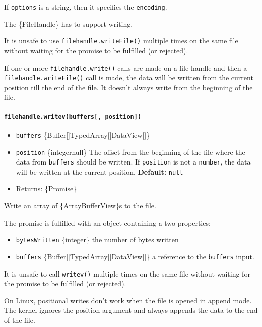 If \texttt{options} is a string, then it specifies the
\texttt{encoding}.

The \{FileHandle\} has to support writing.

It is unsafe to use \texttt{filehandle.writeFile()} multiple times on
the same file without waiting for the promise to be fulfilled (or
rejected).

If one or more \texttt{filehandle.write()} calls are made on a file
handle and then a \texttt{filehandle.writeFile()} call is made, the data
will be written from the current position till the end of the file. It
doesn't always write from the beginning of the file.

\paragraph{\texorpdfstring{\texttt{filehandle.writev(buffers{[},\ position{]})}}{filehandle.writev(buffers{[}, position{]})}}\label{filehandle.writevbuffers-position}

\begin{itemize}
\tightlist
\item
  \texttt{buffers}
  \{Buffer{[}{]}\textbar TypedArray{[}{]}\textbar DataView{[}{]}\}
\item
  \texttt{position} \{integer\textbar null\} The offset from the
  beginning of the file where the data from \texttt{buffers} should be
  written. If \texttt{position} is not a \texttt{number}, the data will
  be written at the current position. \textbf{Default:} \texttt{null}
\item
  Returns: \{Promise\}
\end{itemize}

Write an array of \{ArrayBufferView\}s to the file.

The promise is fulfilled with an object containing a two properties:

\begin{itemize}
\tightlist
\item
  \texttt{bytesWritten} \{integer\} the number of bytes written
\item
  \texttt{buffers}
  \{Buffer{[}{]}\textbar TypedArray{[}{]}\textbar DataView{[}{]}\} a
  reference to the \texttt{buffers} input.
\end{itemize}

It is unsafe to call \texttt{writev()} multiple times on the same file
without waiting for the promise to be fulfilled (or rejected).

On Linux, positional writes don't work when the file is opened in append
mode. The kernel ignores the position argument and always appends the
data to the end of the file.

